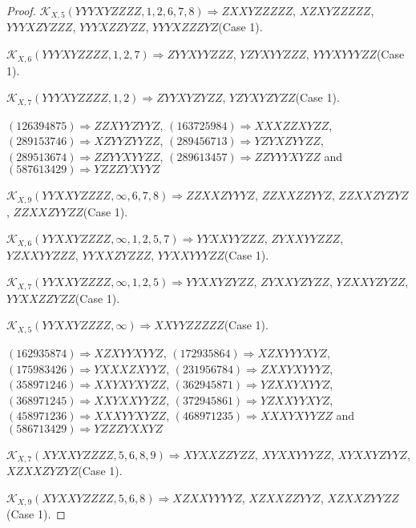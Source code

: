 \documentclass[12pt]{article}
\theoremstyle{plain}
\theoremstyle{definition}
\theoremstyle{remark}
\newcommand{\fancy}[1]{\mathcal{#1}}
\def\K{\fancy{K}}
\begin{document}
\begin{proof}
	$\K_{X,5}(YYYXYZZZZ,1, 2, 6, 7, 8)\Rightarrow $$ZXXYZZZZZ$, $XZXYZZZZZ$, $YYYXZYZZZ$, $YYYXZZYZZ$, $YYYXZZZYZ$(Case 1).
	
	$\K_{X,6}(YYYXYZZZZ,1, 2, 7)\Rightarrow $$ZYYXYYZZZ$, $YZYXYYZZZ$, $YYYXYYYZZ$(Case 1).
	
	$\K_{X,7}(YYYXYZZZZ,1, 2)\Rightarrow $$ZYYXYZYZZ$, $YZYXYZYZZ$(Case 1).
	
	
	
	$(1 2 6 3 9 4 8 7 5)\Rightarrow ZZXYYZYYZ$, $(1 6 3 7 2 5 9 8 4)\Rightarrow XXXZZXYZZ$, $(2 8 9 1 5 3 7 4 6)\Rightarrow XZYYZYYZZ$, $(2 8 9 4 5 6 7 1 3)\Rightarrow YZYXZYYZZ$, $(2 8 9 5 1 3 6 7 4)\Rightarrow ZZYYXYYZZ$, $(2 8 9 6 1 3 4 5 7)\Rightarrow ZZYYYXYZZ$ and $(5 8 7 6 1 3 4 2 9)\Rightarrow YZZZYXYYZ$
	
	
	$\K_{X,9}(YYXXYZZZZ,\infty,6, 7, 8)\Rightarrow $$ZZXXZYYYZ$, $ZZXXZZYYZ$, $ZZXXZYZYZ$, $ZZXXZYYZZ$(Case 1).
	
	$\K_{X,6}(YYXXYZZZZ,\infty,1, 2, 5, 7)\Rightarrow $$YYXXYYZZZ$, $ZYXXYYZZZ$, $YZXXYYZZZ$, $YYXXZYZZZ$, $YYXXYYYZZ$(Case 1).
	
	$\K_{X,7}(YYXXYZZZZ,\infty,1, 2, 5)\Rightarrow $$YYXXYZYZZ$, $ZYXXYZYZZ$, $YZXXYZYZZ$, $YYXXZZYZZ$(Case 1).
	
	$\K_{X,5}(YYXXYZZZZ,\infty)\Rightarrow $$XXYYZZZZZ$(Case 1).
	
	
	
	$(1 6 2 9 3 5 8 7 4)\Rightarrow XZXYYXYYZ$, $(1 7 2 9 3 5 8 6 4)\Rightarrow XZXYYYXYZ$, $(1 7 5 9 8 3 4 2 6)\Rightarrow YXXXZXYYZ$, $(2 3 1 9 5 6 7 8 4)\Rightarrow ZXXYXYYYZ$, $(3 5 8 9 7 1 2 4 6)\Rightarrow XXYXYXYZZ$, $(3 6 2 9 4 5 8 7 1)\Rightarrow YZXXYXYYZ$, $(3 6 8 9 7 1 2 4 5)\Rightarrow XXYXXYYZZ$, $(3 7 2 9 4 5 8 6 1)\Rightarrow YZXXYYXYZ$, $(4 5 8 9 7 1 2 3 6)\Rightarrow XXXYYXYZZ$, $(4 6 8 9 7 1 2 3 5)\Rightarrow XXXYXYYZZ$ and $(5 8 6 7 1 3 4 2 9)\Rightarrow YZZZYXXYZ$
	
	
	$\K_{X,7}(XYXXYZZZZ,5, 6, 8, 9)\Rightarrow $$XYXXZZYZZ$, $XYXXYYYZZ$, $XYXXYZYYZ$, $XZXXZYZYZ$(Case 1).
	
	$\K_{X,9}(XYXXYZZZZ,5, 6, 8)\Rightarrow $$XZXXYYYYZ$, $XZXXZZYYZ$, $XZXXZYYZZ$(Case 1).
	
	
	

\end{proof}
\end{document}
